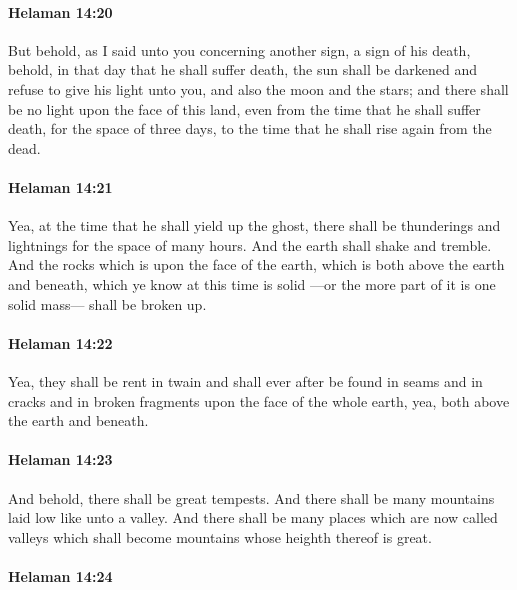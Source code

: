 		\paragraph{Helaman 14:20} %
			\label{HELAMAN-14-20}

			But behold, as I said unto you concerning another sign, a sign of his death,
			behold, in that day that he shall suffer death,
			the sun shall be darkened and refuse to give his light unto you,
			and also the moon and the stars;
			and there shall be no light upon the face of this land,
			even from the time that he shall suffer death,
			for the space of three days,
			to the time that he shall rise again from the dead.

		\paragraph{Helaman 14:21} %
			\label{HELAMAN-14-21}

			Yea, at the time that he shall yield up the ghost,
			there shall be thunderings and lightnings for the space of many hours.
			And the earth shall shake and tremble.
			And the rocks which is upon the face of the earth,
			which is both above the earth and beneath,
			which ye know at this time is solid
			---or the more part of it is one solid mass---
			shall be broken up.

		\paragraph{Helaman 14:22} %
			\label{HELAMAN-14-22}

			Yea, they shall be rent in twain
			and shall ever after be found in seams and in cracks
			and in broken fragments upon the face of the whole earth,
			yea, both above the earth and beneath.

		\paragraph{Helaman 14:23} %
			\label{HELAMAN-14-23}

			And behold, there shall be great tempests.
			And there shall be many mountains laid low like unto a valley.
			And there shall be many places which are now called valleys
			which shall become mountains whose heighth thereof is great.

		\paragraph{Helaman 14:24} %
			\label{HELAMAN-14-24}

